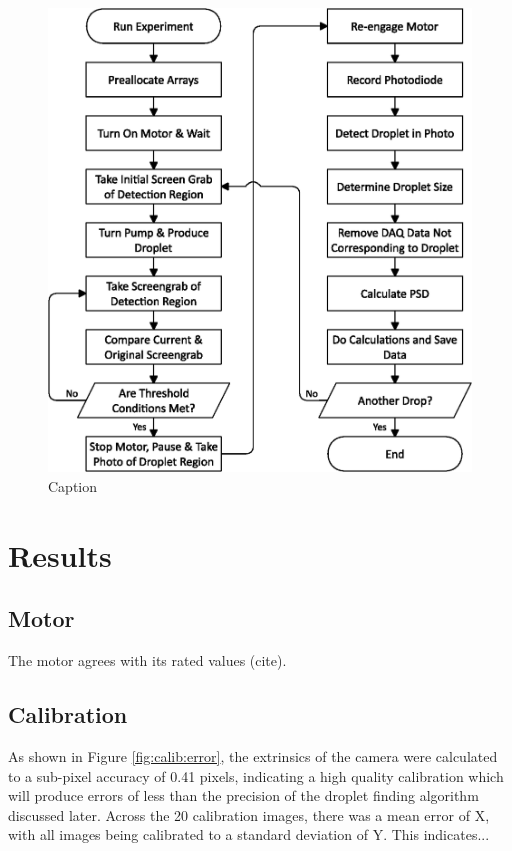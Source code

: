 \documentclass{physics_article_B}
\begin{document}
        \begin{figure}
            \centering
            \hspace*{-1cm}\includegraphics[scale=0.8]{Figures/FlowLogic.eps}
            \caption{Caption}
            \label{fig:setup:logic}
        \end{figure}
    
\section{Results}
    
    \subsection{Motor}
    
        The motor agrees with its rated values (cite).
    
    \subsection{Calibration}
     As shown in Figure \ref{fig:calib:error}, the extrinsics of the camera were calculated to a sub-pixel accuracy of 0.41 pixels, indicating a high quality calibration which will produce errors of less than the precision of the droplet finding algorithm discussed later. Across the 20 calibration images, there was a mean error of X, with all images being calibrated to a standard deviation of Y. This indicates...\\
        
\end{document}
